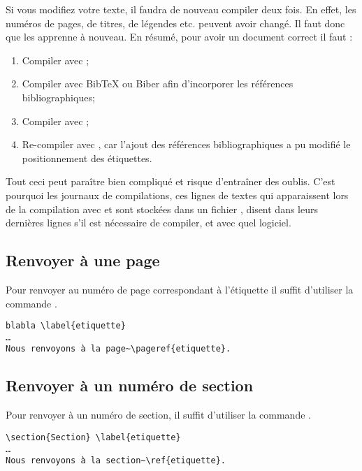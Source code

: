 \begin{attention}
	Si vous modifiez votre texte, il faudra de nouveau compiler deux fois. En effet, les numéros de pages, de titres, de légendes etc. peuvent avoir changé. Il faut donc  que \XeLaTeX{} les apprenne à nouveau. En résumé, pour avoir un document correct il faut :
	\begin{enumerate}
		\item Compiler avec \XeLaTeX{};
		\item Compiler avec BibTeX ou Biber afin d'incorporer les références bibliographiques;
		\item Compiler avec \XeLaTeX{};
		\item Re-compiler avec \XeLaTeX{}, car l'ajout des références bibliographiques a pu modifié le positionnement des étiquettes.
	\end{enumerate}
	
	Tout ceci peut paraître bien compliqué et risque d'entraîner des oublis. C'est pourquoi les journaux de compilations, ces lignes de textes qui apparaissent lors de la compilation avec \XeLaTeX{} et sont stockées dans un fichier , disent dans leurs dernières lignes s'il est nécessaire de compiler, et avec quel logiciel.
\end{attention}

\subsection{Renvoyer à une page}

Pour renvoyer au numéro de page correspondant à l'étiquette  il suffit d'utiliser la commande .

\begin{verbatim}
blabla \label{etiquette}
…
Nous renvoyons à la page~\pageref{etiquette}.
\end{verbatim}

\subsection{Renvoyer à un numéro de section}

Pour renvoyer à un numéro de section, il suffit d'utiliser la commande .

\begin{verbatim}
\section{Section} \label{etiquette}
…
Nous renvoyons à la section~\ref{etiquette}.
\end{verbatim}
 
